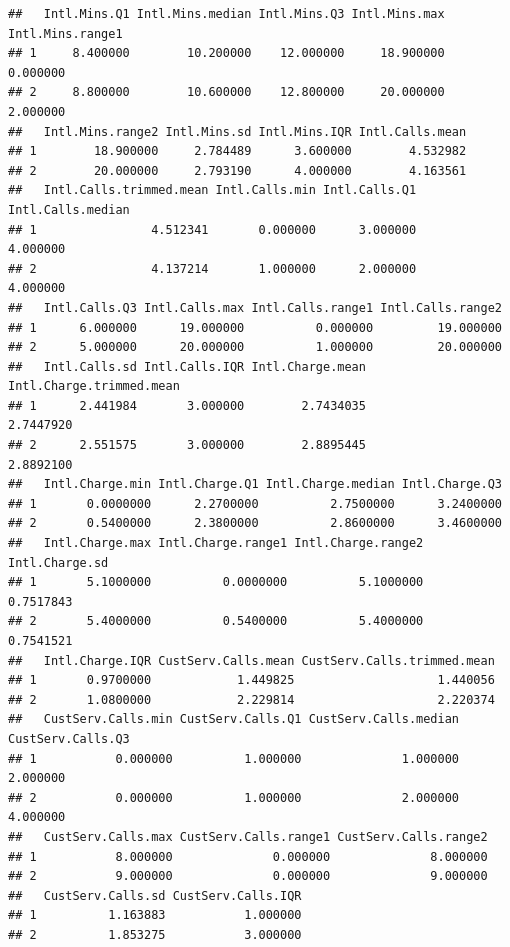 \documentclass{article}\usepackage[]{graphicx}\usepackage[]{color}
\makeatletter
\newenvironment{kframe}{%
 \def\at@end@of@kframe{}%
 \ifinner\ifhmode%
  \def\at@end@of@kframe{\end{minipage}}%
  \begin{minipage}{\columnwidth}%
 \fi\fi%
 \def\FrameCommand##1{\hskip\@totalleftmargin \hskip-\fboxsep
 \colorbox{shadecolor}{##1}\hskip-\fboxsep
     \hskip-\linewidth \hskip-\@totalleftmargin \hskip\columnwidth}%
 \MakeFramed {\advance\hsize-\width
   \@totalleftmargin\z@ \linewidth\hsize
   \@setminipage}}%
 {\par\unskip\endMakeFramed%
 \at@end@of@kframe}
\newenvironment{knitrout}{}{} %
\makeatother
\begin{document}
\begin{description}
\begin{knitrout}
\begin{kframe}
\begin{verbatim}
##   Intl.Mins.Q1 Intl.Mins.median Intl.Mins.Q3 Intl.Mins.max Intl.Mins.range1
## 1     8.400000        10.200000    12.000000     18.900000         0.000000
## 2     8.800000        10.600000    12.800000     20.000000         2.000000
##   Intl.Mins.range2 Intl.Mins.sd Intl.Mins.IQR Intl.Calls.mean
## 1        18.900000     2.784489      3.600000        4.532982
## 2        20.000000     2.793190      4.000000        4.163561
##   Intl.Calls.trimmed.mean Intl.Calls.min Intl.Calls.Q1 Intl.Calls.median
## 1                4.512341       0.000000      3.000000          4.000000
## 2                4.137214       1.000000      2.000000          4.000000
##   Intl.Calls.Q3 Intl.Calls.max Intl.Calls.range1 Intl.Calls.range2
## 1      6.000000      19.000000          0.000000         19.000000
## 2      5.000000      20.000000          1.000000         20.000000
##   Intl.Calls.sd Intl.Calls.IQR Intl.Charge.mean Intl.Charge.trimmed.mean
## 1      2.441984       3.000000        2.7434035                2.7447920
## 2      2.551575       3.000000        2.8895445                2.8892100
##   Intl.Charge.min Intl.Charge.Q1 Intl.Charge.median Intl.Charge.Q3
## 1       0.0000000      2.2700000          2.7500000      3.2400000
## 2       0.5400000      2.3800000          2.8600000      3.4600000
##   Intl.Charge.max Intl.Charge.range1 Intl.Charge.range2 Intl.Charge.sd
## 1       5.1000000          0.0000000          5.1000000      0.7517843
## 2       5.4000000          0.5400000          5.4000000      0.7541521
##   Intl.Charge.IQR CustServ.Calls.mean CustServ.Calls.trimmed.mean
## 1       0.9700000            1.449825                    1.440056
## 2       1.0800000            2.229814                    2.220374
##   CustServ.Calls.min CustServ.Calls.Q1 CustServ.Calls.median CustServ.Calls.Q3
## 1           0.000000          1.000000              1.000000          2.000000
## 2           0.000000          1.000000              2.000000          4.000000
##   CustServ.Calls.max CustServ.Calls.range1 CustServ.Calls.range2
## 1           8.000000              0.000000              8.000000
## 2           9.000000              0.000000              9.000000
##   CustServ.Calls.sd CustServ.Calls.IQR
## 1          1.163883           1.000000
## 2          1.853275           3.000000
\end{verbatim}
\end{kframe}
\end{knitrout}


\end{description}
\end{document}
